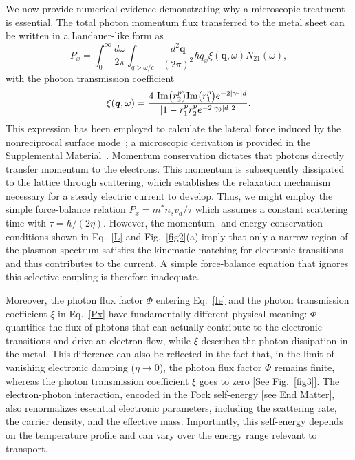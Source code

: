 \documentclass[aps,prl,twocolumn,longbibliography]{revtex4-2}
\begin{document}
We now provide numerical evidence demonstrating why a microscopic treatment is essential.
The total photon momentum flux transferred to the metal sheet can be written in a
Landauer-like form as~\cite{SM}
\begin{equation} \label{Px}
  P_x = \int_0^{\infty} \frac{d\omega}{2\pi} \int_{q>
  \omega/c}\frac{d^2\bm{q}}{(2\pi)^2} \hbar q_x \xi(\bm{q} ,\omega) N_{21}(\omega) ,
\end{equation}
with the photon transmission coefficient
\begin{equation}
  \xi(\bm{q},\omega) = \frac{4 \ {\rm Im}\big(r_2^p \big) {\rm Im}\big( r_1^p \big)
  e^{-2 |\gamma_0| d}}{|1 - r_1^p r_2^p e^{-2 |\gamma_0| d}|^2}.
\end{equation}
This expression has been employed to calculate the lateral force induced by the
nonreciprocal surface mode~\cite{lateral_17, lateral_21, GT24-2}; a microscopic derivation
is provided in the Supplemental Material~\cite{SM}.
Momentum conservation dictates that photons directly transfer momentum to the electrons.
This momentum is subsequently dissipated to the lattice through scattering, which
establishes the relaxation mechanism necessary for a steady electric current to develop.
Thus, we might employ the simple force-balance relation $P_x = m^* n_s v_d /\tau$ which
assumes a constant scattering time with $\tau =\hbar/(2\eta)$.
However, the momentum- and energy-conservation conditions shown in Eq.~\eqref{L} and
Fig.~\ref{fig2}(a) imply that only a narrow region of the plasmon spectrum satisfies the
kinematic matching for electronic transitions and thus contributes to the current. A
simple force-balance equation that ignores this selective coupling is therefore
inadequate.

Moreover, the photon flux factor $\Phi$ entering Eq.~\eqref{Ie} and the
photon transmission coefficient $\xi$ in Eq.~\eqref{Px} have fundamentally different
physical meaning: $\Phi$ quantifies the flux of photons that can actually contribute to the
electronic transitions and drive an electron flow, while $\xi$ describes the photon
dissipation in the metal. This difference can also be reflected in the fact that, in the
limit of vanishing electronic damping ($\eta \rightarrow 0$), the
photon flux factor $\Phi$ remains finite, whereas the photon transmission coefficient
$\xi$ goes to zero [See Fig.~\ref{fig3}].
The electron-photon interaction, encoded in the Fock self-energy [see End Matter],
also renormalizes essential electronic parameters, including the scattering rate, the
carrier density, and the effective mass. Importantly, this self-energy depends on the
temperature profile and can vary over the energy range relevant to transport.
\end{document}
